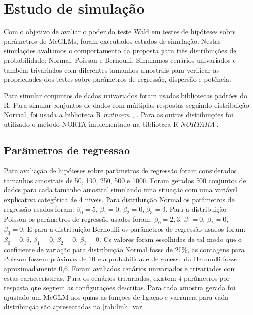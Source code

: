 \chapter{Estudo de simulação}


Com o objetivo de avaliar o poder do teste Wald em testes de hipóteses sobre parâmetros de McGLMs, foram executados estudos de simulação. Nestas simulações avaliamos o comportamento da proposta para três distribuições de probabilidade: Normal, Poisson e Bernoulli. Simulamos cenários univariados e também trivariados com diferentes tamanhos amostrais para verificar as propriedades dos testes sobre parâmetros de regressão, dispersão e potência.

Para simular conjuntos de dados univariados foram usadas bibliotecas padrões do R. Para simular conjuntos de dados com múltiplas respostas seguindo distribuição Normal, foi usada a biblioteca R \emph{mvtnorm} \citep{mvtnorm1}, \citep{mvtnorm2}. Para as outras distribuições foi utilizado o método NORTA \citep{cario1997modeling} implementado na biblioteca R \emph{NORTARA} \citep{nortara}.

\section{Parâmetros de regressão}

Para avaliação de hipóteses sobre parâmetros de regressão foram considerados tamanhos amostrais de 50, 100, 250, 500 e 1000. Foram gerados 500 conjuntos de dados para cada tamanho amostral simulando uma situação com uma variável explicativa categórica de 4 níveis. Para distribuição Normal os parâmetros de regressão usados foram: $\beta_0 = 5$, $\beta_1 = 0$, $\beta_2 = 0$, $\beta_3 = 0$. Para a distribuição Poisson os parâmetros de regressão usados foram: $\beta_0 = 2,3$, $\beta_1 = 0$, $\beta_2 = 0$, $\beta_3 = 0$. E para a distribuição Bernoulli os parâmetros de regressão usados foram: $\beta_0 = 0,5$, $\beta_1 = 0$, $\beta_2 = 0$, $\beta_3 = 0$. Os valores foram escolhidos de tal modo que o coeficiente de variação para distribuição Normal fosse de 20\%, as contagens para Poisson fossem próximas de 10 e a probabilidade de sucesso da Bernoulli fosse aproximadamente 0,6. Foram avaliados cenários univariados e trivariados com estas características. Para os cenários trivariados, existem 4 parâmetros por resposta que seguem as configurações descritas. Para cada amostra gerada foi ajustado um McGLM nos quais as funções de ligação e variância para cada distribuição são apresentadas na \autoref{tab:link_var}. 

